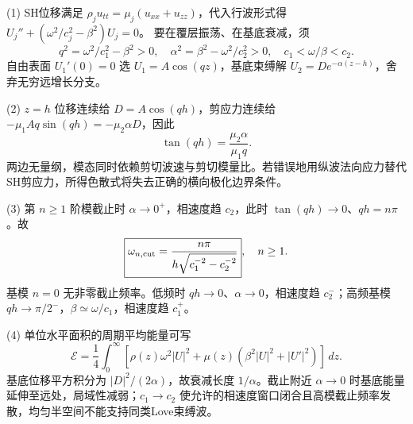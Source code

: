 (1) SH位移满足 \(\rho_j u_{tt}=\mu_j(u_{xx}+u_{zz})\)，代入行波形式得
\(U_j''+(\omega^2/c_j^2-\beta^2)U_j=0\)。
要在覆层振荡、在基底衰减，须
\[
q^2=\omega^2/c_1^2-\beta^2>0,\quad
\alpha^2=\beta^2-\omega^2/c_2^2>0,\quad
c_1<\omega/\beta<c_2.
\]
自由表面 \(U_1'(0)=0\) 选 \(U_1=A\cos(qz)\)，基底束缚解 \(U_2=D e^{-\alpha(z-h)}\)，舍弃无穷远增长分支。

(2) \(z=h\) 位移连续给 \(D=A\cos(qh)\)，剪应力连续给
\(-\mu_1Aq\sin(qh)=-\mu_2\alpha D\)，因此
\[
\boxed{\tan(qh)=\frac{\mu_2\alpha}{\mu_1q}}.
\]
两边无量纲，模态同时依赖剪切波速与剪切模量比。若错误地用纵波法向应力替代SH剪应力，所得色散式将失去正确的横向极化边界条件。

(3) 第 \(n\ge1\) 阶模截止时 \(\alpha\to0^+\)，相速度趋 \(c_2\)，此时 \(\tan(qh)\to0\)、\(qh=n\pi\)。故
\[
\boxed{\omega_{n,\rm cut}=\frac{n\pi}{h\sqrt{c_1^{-2}-c_2^{-2}}}},\quad n\ge1.
\]
基模 \(n=0\) 无非零截止频率。低频时 \(q h\to0\)、\(\alpha\to0\)，相速度趋 \(c_2^-\)；高频基模 \(q h\to\pi/2^-\)，\(\beta\simeq\omega/c_1\)，相速度趋 \(c_1^+\)。

(4) 单位水平面积的周期平均能量可写
\[
\mathcal E=\frac14\int_0^\infty[\rho(z)\omega^2|U|^2+
\mu(z)(\beta^2|U|^2+|U'|^2)]\,dz.
\]
基底位移平方积分为 \(|D|^2/(2\alpha)\)，故衰减长度 \(1/\alpha\)。截止附近 \(\alpha\to0\) 时基底能量延伸至远处，局域性减弱；\(c_1\to c_2\) 使允许的相速度窗口闭合且高模截止频率发散，均匀半空间不能支持同类Love束缚波。
